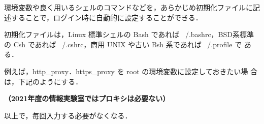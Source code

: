 環境変数や良く用いるシェルのコマンドなどを，あらかじめ初期化ファイルに記
述することで，ログイン時に自動的に設定することができる．

初期化ファイルは，Linux 標準シェルの Bash であれば ~/.bashrc，BSD系標準
の Csh であれば ~/.cshrc，商用 UNIX や古い Bsh 系であれば ~/.profile で
ある．

例えば，http\_proxy．https\_proxy を root の環境変数に設定しておきたい場
合は，下記のようにする．

\textbf{（2021年度の情報実験室ではプロキシは必要ない）}


以上で，毎回入力する必要がなくなる．
